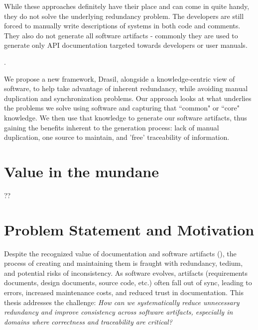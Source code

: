 While these approaches definitely have their place and can come in quite handy,
they do not solve the underlying redundancy problem. The developers are still
forced to manually write descriptions of systems in both code and comments.
They also do not generate all software artifacts - commonly they are used to
generate only API documentation targeted towards developers or user manuals.

.

We propose a new framework, Drasil, alongside a knowledge-centric view of
software, to help take advantage of inherent redundancy, while avoiding 
 manual duplication and synchronization problems. Our approach 
looks at what underlies the problems we solve using software and capturing that 
``common" or ``core" knowledge. We then use that knowledge to generate our 
software artifacts, thus gaining the benefits inherent to the generation 
process: lack of manual duplication, one source to maintain, and 'free' 
traceability of information.

\section{Value in the mundane}
??


\section{Problem Statement and Motivation}
Despite the recognized value of documentation and software artifacts (\sfs{}), 
the process of creating and maintaining them is fraught with redundancy, 
tedium, and potential risks of inconsistency. As software evolves, artifacts 
(requirements documents, design documents, source code, etc.) often fall out of 
sync, leading to errors, increased maintenance costs, and reduced trust in 
documentation. This thesis addresses the challenge: \emph{How can we 
systematically reduce unnecessary redundancy and improve consistency across 
software artifacts, especially in domains where correctness and traceability 
are critical?}

